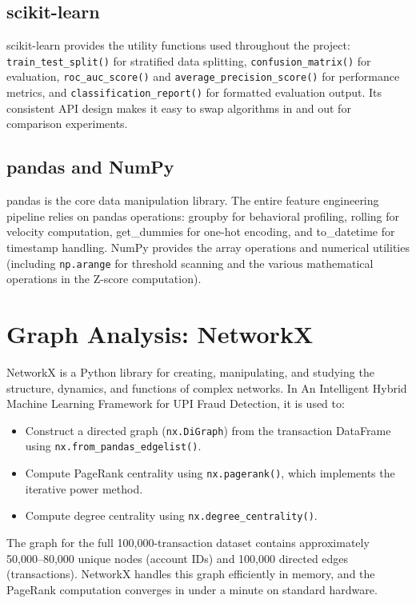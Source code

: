 \subsection{scikit-learn}

scikit-learn provides the utility functions used throughout the project: \texttt{train\_test\_split()} for stratified data splitting, \texttt{confusion\_matrix()} for evaluation, \texttt{roc\_auc\_score()} and \texttt{average\_precision\_score()} for performance metrics, and \texttt{classification\_report()} for formatted evaluation output. Its consistent API design makes it easy to swap algorithms in and out for comparison experiments.

\subsection{pandas and NumPy}

pandas is the core data manipulation library. The entire feature engineering pipeline relies on pandas operations: groupby for behavioral profiling, rolling for velocity computation, get\_dummies for one-hot encoding, and to\_datetime for timestamp handling. NumPy provides the array operations and numerical utilities (including \texttt{np.arange} for threshold scanning and the various mathematical operations in the Z-score computation).

\section{Graph Analysis: NetworkX}

NetworkX is a Python library for creating, manipulating, and studying the structure, dynamics, and functions of complex networks. In An Intelligent Hybrid Machine Learning Framework for UPI Fraud Detection, it is used to:

\begin{itemize}
    \item Construct a directed graph (\texttt{nx.DiGraph}) from the transaction DataFrame using \texttt{nx.from\_pandas\_edgelist()}.
    \item Compute PageRank centrality using \texttt{nx.pagerank()}, which implements the iterative power method.
    \item Compute degree centrality using \texttt{nx.degree\_centrality()}.
\end{itemize}

The graph for the full 100,000-transaction dataset contains approximately 50,000--80,000 unique nodes (account IDs) and 100,000 directed edges (transactions). NetworkX handles this graph efficiently in memory, and the PageRank computation converges in under a minute on standard hardware.

